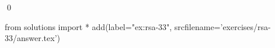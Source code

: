 
\begin{ex} 
  \label{ex:rsa-33}
  
  \qed
\end{ex} 
\begin{python0}
from solutions import *
add(label="ex:rsa-33",
    srcfilename='exercises/rsa-33/answer.tex') 
\end{python0}
